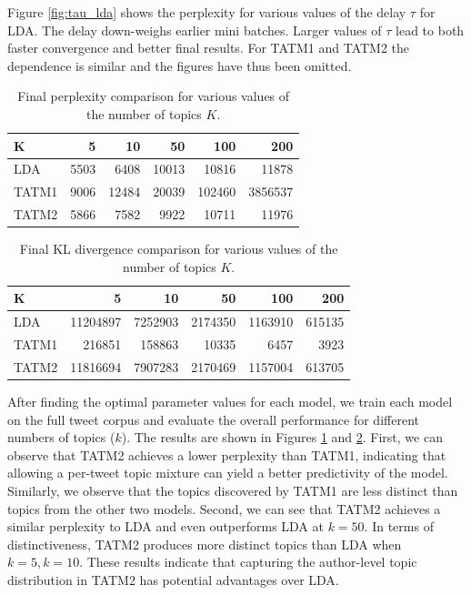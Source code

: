 Figure \ref{fig:tau_lda} shows the perplexity for various values of the delay $\tau$ for LDA. The delay down-weighs earlier mini batches. Larger values of $\tau$ lead to both faster convergence and better final results. For TATM1 and TATM2 the dependence is similar and the figures have thus been omitted.
%
\begin{table}[h]
\centering
\begin{tabular}{l||r|r|r|r|r}
K	&5 &	10&	50	&100&	200 \\ \hline \hline 
LDA	&5503&	6408&	10013 &10816	&11878\\ \hline
TATM1&	9006	&12484&	20039&	102460&	3856537 \\ \hline
TATM2&	5866	&7582&	9922&	10711& 11976 \\
\end{tabular}
\caption{Final perplexity comparison for various values of the number of topics $K$.}
\label{tab:perplexity}
\end{table}
%
\begin{table}[h]
\centering
\begin{tabular}{l||r|r|r|r|r}
K	&5 &	10&	50	&100&	200 \\ \hline \hline 
LDA	&11204897	&7252903	&2174350	&1163910 &615135  \\ \hline
TATM1	&216851 &158863	&10335	&6457	&3923 \\ \hline
TATM2	&11816694	&7907283&	2170469	&1157004 &613705  \\
\end{tabular}
\caption{Final KL divergence comparison for various values of the number of topics $K$.}
\label{tab:kl}
\end{table}
%

After finding the optimal parameter values for each model, we train each model on the full tweet corpus and evaluate the overall performance for different numbers of topics ($k$). The results are shown in Figures \ref{tab:perplexity} and \ref{tab:kl}. First, we can observe that TATM2 achieves a lower perplexity than TATM1, indicating that allowing a per-tweet topic mixture can yield a better predictivity of the model. Similarly, we observe that the topics discovered by TATM1 are less distinct than topics from the other two models. Second, we can see that TATM2 achieves a similar perplexity to LDA and even outperforms LDA at $k=50$. In terms of distinctiveness, TATM2 produces more distinct topics than LDA when $k=5, k=10$. These results indicate that capturing the author-level topic distribution in TATM2 has potential advantages over LDA.